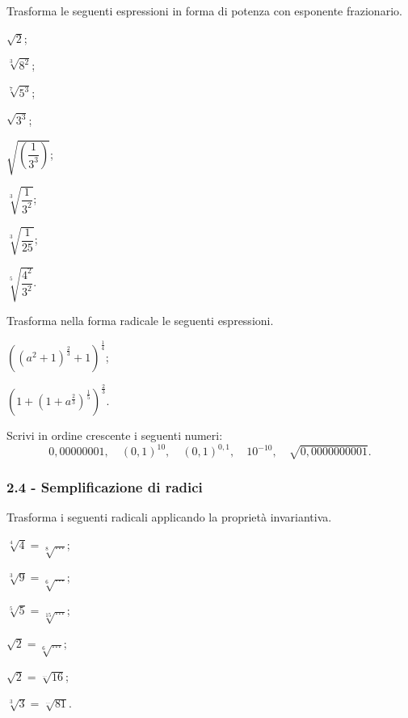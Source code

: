 \begin{esercizio}[\Ast]
 \label{ese:2.18}
Trasforma le seguenti espressioni in forma di potenza con esponente frazionario.
 \begin{multicols}{3}
 \begin{enumeratea}
 \item $\sqrt 2$;
 \item $\sqrt[3]{8^2}$;
 \item $\sqrt[7]{5^3}$;
 \item $\sqrt{3^3}$;
 \item $\sqrt{\left(\dfrac 1{3^3}\right)}$;
 \item $\sqrt[3]{\dfrac 1{3^2}}$;
 \item $\sqrt[3]{\dfrac 1{25}}$;
 \item $\sqrt[5]{\dfrac{4^2}{3^2}}$.
 \end{enumeratea}
 \end{multicols}
\end{esercizio}
\newpage
\begin{esercizio}[\Ast]
\label{ese:2.19}
 Trasforma nella forma radicale le seguenti espressioni.
 \begin{multicols}{2}
 \begin{enumeratea}
 \item $\left(\left(a^2+1\right)^{\frac 2 3}+1\right)^{\frac 1 4}$;
 \item $\left(1+\left(1+a^{\frac 2 3}\right)^{\frac 1 5}\right)^{\frac 2 3}$.
 \end{enumeratea}
 \end{multicols}
\end{esercizio}

\begin{esercizio}
 \label{ese:2.20}
Scrivi in ordine crescente i seguenti numeri:
 \[0,00000001,\quad (0,1)^{10},\quad (0,1)^{0,1},\quad 10^{-10},\quad \sqrt{0,0000000001}.\]
\end{esercizio}

\subsubsection*{2.4 - Semplificazione di radici}
\begin{esercizio}
 \label{ese:2.21}
Trasforma i seguenti radicali applicando la proprietà invariantiva.
 \begin{multicols}{3}
 \begin{enumeratea}
 \item $\sqrt[4]4=\sqrt[8]{\ldots}$;
 \item $\sqrt[3]9=\sqrt[6]{\ldots}$;
 \item $\sqrt[5]5=\sqrt[15]{\ldots}$;
 \item $\sqrt 2=\sqrt[6]{\ldots}$;
 \item $\sqrt 2=\sqrt[\ldots]{16}$;
 \item $\sqrt[3]3=\sqrt[\ldots]{81}$.
 \end{enumeratea}
 \end{multicols}
\end{esercizio}

